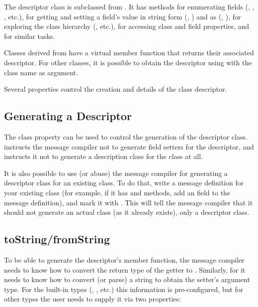 The descriptor class is subclassed from . It has
methods for enumerating fields (, ,
, etc.), for getting and setting a field's value in
string form (, ) and as
 (, ), for
exploring the class hierarchy (, etc.), for
accessing class and field properties, and for similar tasks.

Classes derived from  have a virtual member function
 that returns their associated descriptor. For other
classes, it is possible to obtain the descriptor using
 with the class name as argument.

Several properties control the creation and details of the class descriptor.


\subsection{Generating a Descriptor}
\label{sec:msg-defs:descriptor-property}

The  class property can be used to control the generation
of the descriptor class.  instructs the message
compiler not to generate field setters for the descriptor, and
 instructs it not to generate a description class
for the class at all.

It is also possible to use (or abuse) the message compiler for generating a
descriptor class for an existing class. To do that, write a message definition
for your existing class (for example, if it has  and
 methods, add an  field to the message
definition), and mark it with . This will tell the
message compiler that it should not generate an actual class (as it already
exists), only a descriptor class.


\subsection{toString/fromString}
\label{sec:msg-defs:descriptor-tostring}

To be able to generate the descriptor's  member
function, the message compiler needs to know how to convert the return type of
the getter to . Similarly, for  it
needs to know how to convert (or parse) a string to obtain the setter's argument
type. For the built-in types (, , etc.) this information is
pre-configured, but for other types the user needs to supply it via two
properties:

